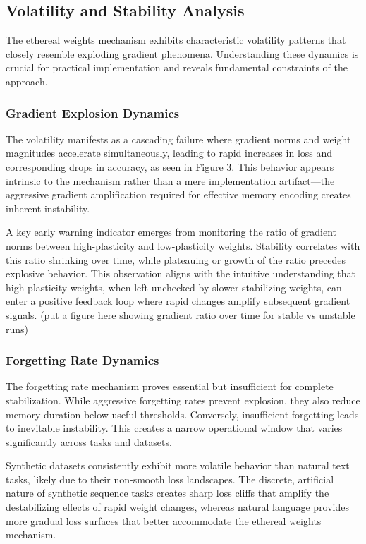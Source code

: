 \documentclass{article} %
\begin{document}
\subsection{Volatility and Stability Analysis}

The ethereal weights mechanism exhibits characteristic volatility patterns that closely resemble exploding gradient phenomena. Understanding these dynamics is crucial for practical implementation and reveals fundamental constraints of the approach.

\subsubsection{Gradient Explosion Dynamics}

The volatility manifests as a cascading failure where gradient norms and weight magnitudes accelerate simultaneously, leading to rapid increases in loss and corresponding drops in accuracy, as seen in Figure 3. This behavior appears intrinsic to the mechanism rather than a mere implementation artifact—the aggressive gradient amplification required for effective memory encoding creates inherent instability.

A key early warning indicator emerges from monitoring the ratio of gradient norms between high-plasticity and low-plasticity weights. Stability correlates with this ratio shrinking over time, while plateauing or growth of the ratio precedes explosive behavior. This observation aligns with the intuitive understanding that high-plasticity weights, when left unchecked by slower stabilizing weights, can enter a positive feedback loop where rapid changes amplify subsequent gradient signals.
(put a figure here showing gradient ratio over time for stable vs unstable runs)

\subsubsection{Forgetting Rate Dynamics}

The forgetting rate mechanism proves essential but insufficient for complete stabilization. While aggressive forgetting rates prevent explosion, they also reduce memory duration below useful thresholds. Conversely, insufficient forgetting leads to inevitable instability. This creates a narrow operational window that varies significantly across tasks and datasets.

Synthetic datasets consistently exhibit more volatile behavior than natural text tasks, likely due to their non-smooth loss landscapes. The discrete, artificial nature of synthetic sequence tasks creates sharp loss cliffs that amplify the destabilizing effects of rapid weight changes, whereas natural language provides more gradual loss surfaces that better accommodate the ethereal weights mechanism.
\end{document}

